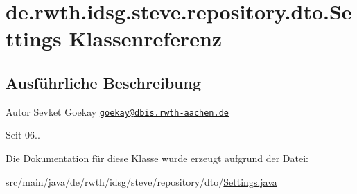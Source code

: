 \hypertarget{classde_1_1rwth_1_1idsg_1_1steve_1_1repository_1_1dto_1_1_settings}{\section{de.\-rwth.\-idsg.\-steve.\-repository.\-dto.\-Settings Klassenreferenz}
\label{classde_1_1rwth_1_1idsg_1_1steve_1_1repository_1_1dto_1_1_settings}
}


\subsection{Ausführliche Beschreibung}
\begin{DoxyAuthor}{Autor}
Sevket Goekay \href{mailto:goekay@dbis.rwth-aachen.de}{\tt goekay@dbis.\-rwth-\/aachen.\-de} 
\end{DoxyAuthor}
\begin{DoxySince}{Seit}
06.. 
\end{DoxySince}


Die Dokumentation für diese Klasse wurde erzeugt aufgrund der Datei\-:\begin{DoxyCompactItemize}
\item 
src/main/java/de/rwth/idsg/steve/repository/dto/\hyperlink{_settings_8java}{Settings.\-java}\end{DoxyCompactItemize}
